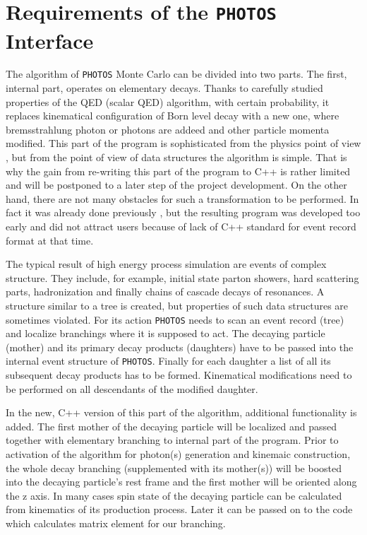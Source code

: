 \documentclass[]{Photos_interface_design}
\begin{document}
\section{Requirements of the {\tt PHOTOS} Interface}
\label{sec:requrements}
The algorithm of {\tt PHOTOS} Monte Carlo can be divided into two parts.
The first, internal part, operates on elementary decays. Thanks to carefully 
studied properties of the 
QED (scalar QED) algorithm, with certain probability, 
it replaces kinematical configuration of Born level decay with a new one, 
where bremsstrahlung photon or photons
are addeed and other particle momenta modified. This part of the program is sophisticated from the physics 
point of view \cite{Nanava:2006vv,Golonka:2006tw},
but from the point of view of data structures the algorithm is simple.
That is why the gain from re-writing this part of the program to C++ is rather
limited and will be postponed to a later step of the project development.
On the other hand, there are not many obstacles for such a transformation to be
performed. In fact it was already done
previously \cite{photosplus}, but the resulting program was developed too early 
and did not attract users because of lack of C++ standard for event record format at that time.

The typical result of high energy process simulation are events of complex structure.
They include, for example, initial state parton showers, hard scattering parts,
hadronization and finally chains of cascade decays of resonances. 
A structure similar to a tree is created, but properties of such data structures
are sometimes violated.
For its action {\tt PHOTOS} needs to scan an event record (tree) 
and localize branchings where
it is supposed to act. The decaying particle (mother) and its primary decay products
(daughters) have to be passed into the internal event structure of {\tt PHOTOS}. 
Finally for each daughter a list of all its subsequent decay products has to be 
formed. Kinematical modifications need to be performed on all descendants of the modified daughter.

In the new, C++ version of this part of the algorithm, additional functionality
is added.
The first mother of the decaying particle will be localized and passed together with  
elementary branching to internal part of the program. 
Prior to activation of the algorithm for  photon(s) generation and kinemaic construction,
 the whole decay branching 
(supplemented with its mother(s))
will be boosted into the decaying particle's rest frame and the first mother
will be oriented along the z axis. 
In many cases spin state of the decaying particle  can be calculated from kinematics of its production process.
Later it can be passed on to the code which calculates matrix element for our branching.
\end{document}
